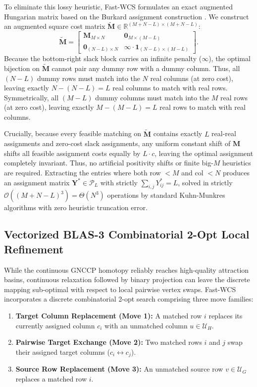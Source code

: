 \documentclass[conference]{IEEEtran}
\begin{document}
To eliminate this lossy heuristic, Fast-WCS formulates an exact augmented Hungarian matrix based on the Burkard assignment construction \cite{loiola2007}. We construct an augmented square cost matrix $\tilde{\mathbf{M}} \in \mathbb{R}^{(M+N-L) \times (M+N-L)}$:
\begin{equation}
\tilde{\mathbf{M}} = \begin{bmatrix}
\mathbf{M}_{M \times N} & \mathbf{0}_{M \times (M - L)} \\
\mathbf{0}_{(N - L) \times N} & \infty \cdot \mathbf{1}_{(N - L) \times (M - L)}
\end{bmatrix}.
\label{eq:augmented_hungarian}
\end{equation}
Because the bottom-right slack block carries an infinite penalty ($\infty$), the optimal bijection on $\tilde{\mathbf{M}}$ cannot pair any dummy row with a dummy column. Thus, all $(N - L)$ dummy rows must match into the $N$ real columns (at zero cost), leaving exactly $N - (N - L) = L$ real columns to match with real rows. Symmetrically, all $(M - L)$ dummy columns must match into the $M$ real rows (at zero cost), leaving exactly $M - (M - L) = L$ real rows to match with real columns.

Crucially, because every feasible matching on $\tilde{\mathbf{M}}$ contains exactly $L$ real-real assignments and zero-cost slack assignments, any uniform constant shift of $\mathbf{M}$ shifts all feasible assignment costs equally by $L \cdot c$, leaving the optimal assignment completely invariant. Thus, no artificial positivity shifts or finite big-$M$ heuristics are required. Extracting the entries where both row $< M$ and col $< N$ produces an assignment matrix $\mathbf{Y}^* \in \mathcal{P}_L$ with strictly $\sum_{i, j} Y^*_{ij} = L$, solved in strictly $\mathcal{O}((M + N - L)^3) = \Theta(N^3)$ operations by standard Kuhn-Munkres algorithms with zero heuristic truncation error.

\subsection{Vectorized BLAS-3 Combinatorial 2-Opt Local Refinement}
\label{subsec:2opt}

While the continuous GNCCP homotopy reliably reaches high-quality attraction basins, continuous relaxation followed by binary projection can leave the discrete mapping sub-optimal with respect to local pairwise vertex swaps. Fast-WCS incorporates a discrete combinatorial 2-opt search comprising three move families:
\begin{enumerate}
    \item \textbf{Target Column Replacement (Move 1):} A matched row $i$ replaces its currently assigned column $c_i$ with an unmatched column $u \in \mathcal{U}_H$.
    \item \textbf{Pairwise Target Exchange (Move 2):} Two matched rows $i$ and $j$ swap their assigned target columns ($c_i \leftrightarrow c_j$).
    \item \textbf{Source Row Replacement (Move 3):} An unmatched source row $v \in \mathcal{U}_G$ replaces a matched row $i$.
\end{enumerate}
\end{document}

